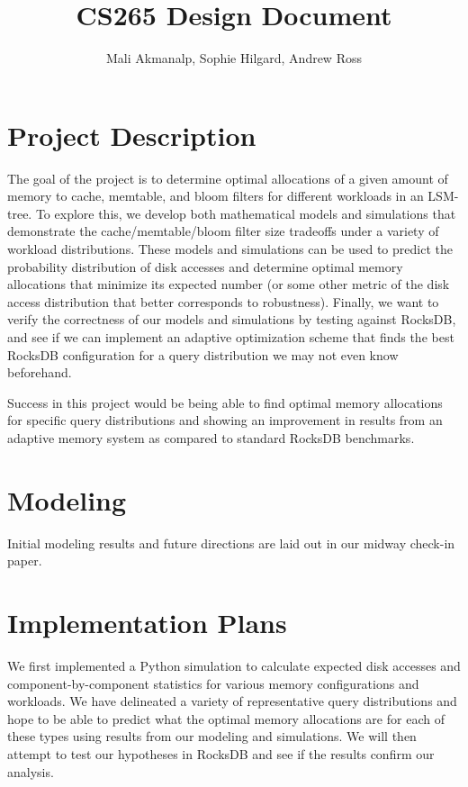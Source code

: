 \documentclass[11pt]{article}
\theoremstyle{plain}
\theoremstyle{definition}
\begin{document}
\title{CS265 Design Document}
\author{Mali Akmanalp, Sophie Hilgard, Andrew Ross}
\maketitle

\section{Project Description}

The goal of the project is to determine optimal allocations of a given amount of memory to cache, memtable, and bloom filters for different workloads in an LSM-tree. To explore this, we develop both mathematical models and simulations that demonstrate the cache/memtable/bloom filter size tradeoffs under a variety of workload distributions. These models and simulations can be used to predict the probability distribution of disk accesses and determine optimal memory allocations that minimize its expected number (or some other metric of the disk access distribution that better corresponds to robustness). Finally, we want to verify the correctness of our models and simulations by testing against RocksDB, and see if we can implement an adaptive optimization scheme that finds the best RocksDB configuration for a query distribution we may not even know beforehand.

Success in this project would be being able to find optimal memory allocations for specific query distributions and showing an improvement in results from an adaptive memory system as compared to standard RocksDB benchmarks.

\section{Modeling}

Initial modeling results and future directions are laid out in our midway check-in paper.

\section{Implementation Plans}

We first implemented a Python simulation to calculate expected disk accesses and component-by-component statistics for various memory configurations and workloads. We have delineated a variety of representative query distributions and hope to be able to predict what the optimal memory allocations are for each of these types using results from our modeling and simulations. We will then attempt to test our hypotheses in RocksDB and see if the results confirm our analysis.
\end{document}
